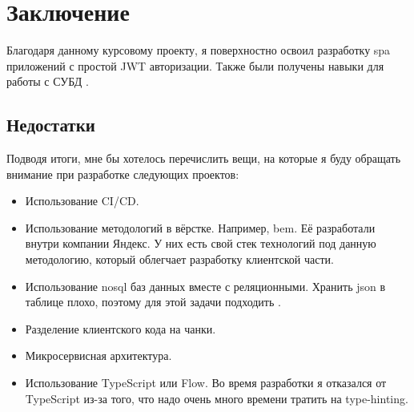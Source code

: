 \section{Заключение}
Благодаря данному курсовому проекту, я поверхностно освоил разработку \acrshort{spa} приложений с простой JWT авторизации. Также были получены навыки для работы с СУБД \textcite{postgres}.

\subsection{Недостатки}
Подводя итоги, мне бы хотелось перечислить вещи, на которые я буду обращать внимание при разработке следующих проектов:
\begin{itemize}
    \item Использование CI/CD.
    \item Использование методологий в вёрстке. Например, \acrfull{bem}. Её разработали внутри компании Яндекс. У них есть свой стек технологий под данную методологию, который облегчает разработку клиентской части.
    \item Использование \acrshort{nosql} баз данных вместе с реляционными. Хранить \acrshort{json} в таблице плохо, поэтому для этой задачи подходить \textcite{mongodb}.
    \item Разделение клиентского кода на чанки.
    \item Микросервисная архитектура.
    \item Использование TypeScript или Flow. Во время разработки я отказался от TypeScript из-за того, что надо очень много времени тратить на type-hinting.
\end{itemize}

\clearpage